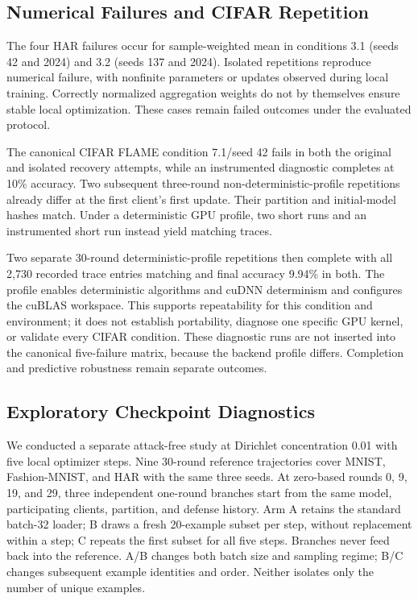 \documentclass[journal]{IEEEtran}
\begin{document}
\subsection{Numerical Failures and CIFAR Repetition}
The four HAR failures occur for sample-weighted mean in conditions 3.1 (seeds 42 and 2024) and 3.2 (seeds 137 and 2024). Isolated repetitions reproduce numerical failure, with nonfinite parameters or updates observed during local training. Correctly normalized aggregation weights do not by themselves ensure stable local optimization. These cases remain failed outcomes under the evaluated protocol.

The canonical CIFAR FLAME condition 7.1/seed 42 fails in both the original and isolated recovery attempts, while an instrumented diagnostic completes at 10\% accuracy. Two subsequent three-round non-deterministic-profile repetitions already differ at the first client's first update. Their partition and initial-model hashes match. Under a deterministic GPU profile, two short runs and an instrumented short run instead yield matching traces.

Two separate 30-round deterministic-profile repetitions then complete with all 2,730 recorded trace entries matching and final accuracy 9.94\% in both. The profile enables deterministic algorithms and cuDNN determinism and configures the cuBLAS workspace. This supports repeatability for this condition and environment; it does not establish portability, diagnose one specific GPU kernel, or validate every CIFAR condition. These diagnostic runs are not inserted into the canonical five-failure matrix, because the backend profile differs. Completion and predictive robustness remain separate outcomes.


\subsection{Exploratory Checkpoint Diagnostics}
We conducted a separate attack-free study at Dirichlet concentration 0.01 with five local optimizer steps. Nine 30-round reference trajectories cover MNIST, Fashion-MNIST, and HAR with the same three seeds. At zero-based rounds 0, 9, 19, and 29, three independent one-round branches start from the same model, participating clients, partition, and defense history. Arm A retains the standard batch-32 loader; B draws a fresh 20-example subset per step, without replacement within a step; C repeats the first subset for all five steps. Branches never feed back into the reference. A/B changes both batch size and sampling regime; B/C changes subsequent example identities and order. Neither isolates only the number of unique examples.
\end{document}
